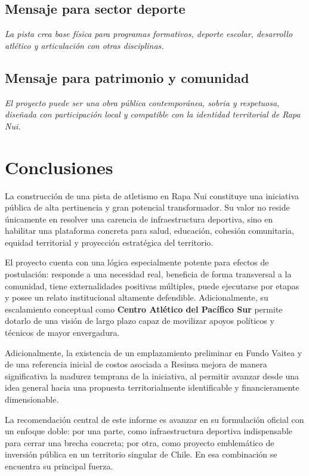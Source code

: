\documentclass[12pt,letterpaper]{article}
\begin{document}
\subsection{Mensaje para sector deporte}

\textit{La pista crea base física para programas formativos, deporte escolar, desarrollo atlético y articulación con otras disciplinas.}

\subsection{Mensaje para patrimonio y comunidad}

\textit{El proyecto puede ser una obra pública contemporánea, sobria y respetuosa, diseñada con participación local y compatible con la identidad territorial de Rapa Nui.}

\section{Conclusiones}

La construcción de una pista de atletismo en Rapa Nui constituye una iniciativa pública de alta pertinencia y gran potencial transformador. Su valor no reside únicamente en resolver una carencia de infraestructura deportiva, sino en habilitar una plataforma concreta para salud, educación, cohesión comunitaria, equidad territorial y proyección estratégica del territorio.

El proyecto cuenta con una lógica especialmente potente para efectos de postulación: responde a una necesidad real, beneficia de forma transversal a la comunidad, tiene externalidades positivas múltiples, puede ejecutarse por etapas y posee un relato institucional altamente defendible. Adicionalmente, su escalamiento conceptual como \textbf{Centro Atlético del Pacífico Sur} permite dotarlo de una visión de largo plazo capaz de movilizar apoyos políticos y técnicos de mayor envergadura.

Adicionalmente, la existencia de un emplazamiento preliminar en Fundo Vaitea y de una referencia inicial de costos asociada a Resinsa mejora de manera significativa la madurez temprana de la iniciativa, al permitir avanzar desde una idea general hacia una propuesta territorialmente identificable y financieramente dimensionable.

La recomendación central de este informe es avanzar en su formulación oficial con un enfoque doble: por una parte, como infraestructura deportiva indispensable para cerrar una brecha concreta; por otra, como proyecto emblemático de inversión pública en un territorio singular de Chile. En esa combinación se encuentra su principal fuerza.
\end{document}
